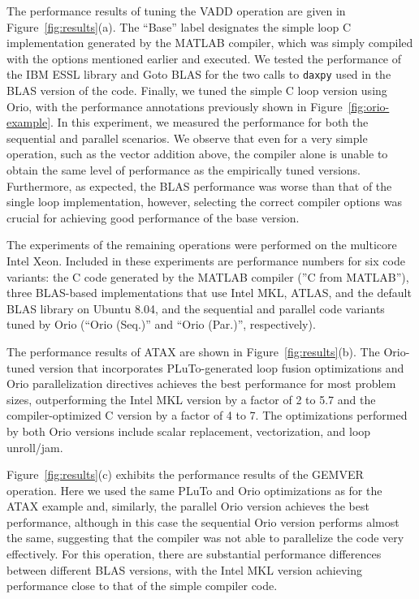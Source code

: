 \documentclass[runningheads]{llncs}
\begin{document}
The performance results of tuning the VADD operation are given in
Figure~\ref{fig:results}(a). The ``Base'' label designates the simple
loop C implementation generated by the MATLAB compiler, which was
simply compiled with the options mentioned earlier and executed. We
tested the performance of the IBM ESSL library and Goto BLAS for the
two calls to \texttt{daxpy} used in the BLAS version of the code.
Finally, we tuned the simple C loop version using Orio, with the
performance annotations previously shown in
Figure~\ref{fig:orio-example}. In this experiment, we measured the
performance for both the sequential and parallel scenarios. We observe
that even for a very simple operation, such as the vector addition
above, the compiler alone is unable to obtain the same level of
performance as the empirically tuned versions. Furthermore, as
expected, the BLAS performance was worse than that of the single loop
implementation, however, selecting the correct compiler options was
crucial for achieving good performance of the base version.

The experiments of the remaining operations were performed on the
multicore Intel Xeon. Included in these experiments are performance
numbers for six code variants: the C code generated by the MATLAB
compiler (''C from MATLAB''), three BLAS-based implementations that
use Intel MKL, ATLAS, and the default BLAS library on Ubuntu 8.04, and
the sequential and parallel code variants tuned by Orio (``Orio
(Seq.)'' and ``Orio (Par.)'', respectively).

The performance results of ATAX are shown in
Figure~\ref{fig:results}(b). The Orio-tuned version that incorporates
PLuTo-generated loop fusion optimizations and Orio parallelization
directives achieves the best performance for most problem sizes,
outperforming the Intel MKL version by a factor of 2 to 5.7 and the
compiler-optimized C version by a factor of 4 to 7. The optimizations
performed by both Orio versions include scalar replacement,
vectorization, and loop unroll/jam.

Figure~\ref{fig:results}(c) exhibits the performance results of the
GEMVER operation. Here we used the same PLuTo and Orio optimizations
as for the ATAX example and, similarly, the parallel Orio version
achieves the best performance, although in this case the sequential
Orio version performs almost the same, suggesting that the compiler was
not able to parallelize the code very effectively. For this operation,
there are substantial performance differences between different BLAS
versions, with the Intel MKL version achieving performance close to
that of the simple compiler code.
\end{document}
